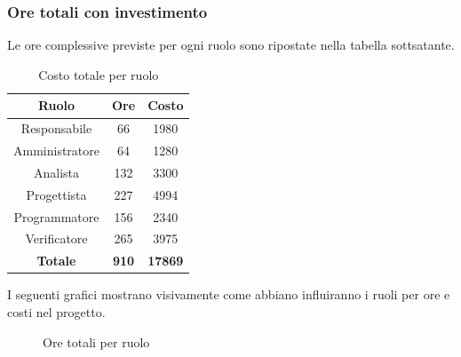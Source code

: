 \subsubsection{Ore totali con investimento}
Le ore complessive previste per ogni ruolo sono ripostate nella tabella sottsatante.
\begin{table}[H]
	\centering
	\begin{tabular}{|c|c|c|}
		\hline
		\textbf{Ruolo} &
		\textbf{Ore} &
		\textbf{Costo} \\
		\hline
		Responsabile & 66 & 1980\\
		\hline
		Amministratore & 64 & 1280\\
		\hline
		Analista & 132 & 3300\\
		\hline
		Progettista & 227 & 4994 \\
		\hline
		Programmatore & 156 & 2340 \\
		\hline
		Verificatore & 265 & 3975\\
		\hline
		\textbf{Totale} & \textbf{910} & \textbf{17869} \\
		\hline
	\end{tabular}
	\caption{Costo totale per ruolo}
\end{table}
I seguenti grafici mostrano visivamente come abbiano influiranno i ruoli per ore e costi nel progetto.
\begin{figure}[H]
	\centering
	\caption{Ore totali per ruolo}
\end{figure}
